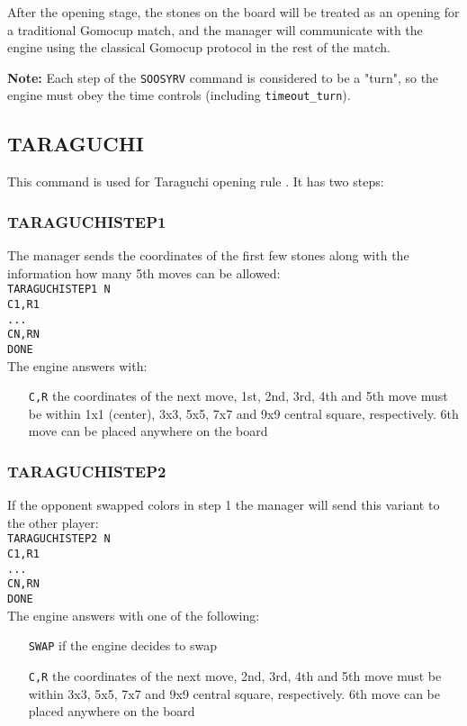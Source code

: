 \documentclass[12pt,a4paper]{article}
\begin{document}
After the opening stage, the stones on the board will be treated as an opening for a traditional Gomocup match, and the manager will communicate with the engine using the classical Gomocup protocol in the rest of the match.

\textbf{Note:} Each step of the \texttt{SOOSYRV} command is considered to be a "turn", so the engine must obey the time controls (including \texttt{timeout{\_}turn}).


\subsection{TARAGUCHI}
\label{cmd_taraguchi}
This command is used for Taraguchi opening rule \cite{renju_opening_rules}. It has two steps:

\subsubsection{TARAGUCHISTEP1}
The manager sends the coordinates of the first few stones along with the information how many 5th moves can be allowed:\\
\texttt{TARAGUCHISTEP1 N}\\
\texttt{C1,R1}\\
\texttt{...}\\
\texttt{CN,RN}\\
\texttt{DONE}\\
The engine answers with:
\begin{enumerate}[leftmargin=7.5em]
\item[\texttt{C,R}]{the coordinates of the next move, 1st, 2nd, 3rd, 4th and 5th move must be within 1x1 (center), 3x3, 5x5, 7x7 and 9x9 central square, respectively. 6th move can be placed anywhere on the board}
\end{enumerate}

\subsubsection{TARAGUCHISTEP2}
If the opponent swapped colors in step 1 the manager will send this variant to the other player:\\
\texttt{TARAGUCHISTEP2 N}\\
\texttt{C1,R1}\\
\texttt{...}\\
\texttt{CN,RN}\\
\texttt{DONE}\\
The engine answers with one of the following:
\begin{enumerate}[leftmargin=7.5em]
\item[\texttt{SWAP}]{if the engine decides to swap}
\item[\texttt{C,R}]{the coordinates of the next move, 2nd, 3rd, 4th and 5th move must be within 3x3, 5x5, 7x7 and 9x9 central square, respectively. 6th move can be placed anywhere on the board}
\end{enumerate}
\end{document}
